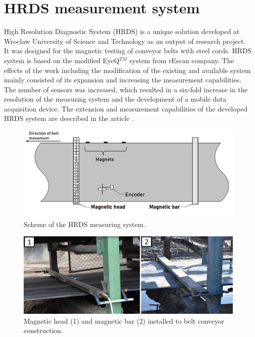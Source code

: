 \documentclass[applsci,article,preprint,moreauthors,pdftex]{Definitions/mdpi}
\begin{document}
\section{HRDS measurement system}

High Resolution Diagnostic System (HRDS) is a unique solution developed at Wroclaw University of Science and Technology as an output of research project. It was designed for the magnetic testing of conveyor belts with steel cords. HRDS system is based on the modified EyeQ$^{TM}$ system from rEscan company. The effects of the work including the modification of the existing and available system mainly consisted of its expansion and increasing the measurement capabilities. The number of sensors was increased, which resulted in a six-fold increase in the resolution of the measuring system and the development of a mobile data acquisition device. The extension and measurement capabilities of the developed HRDS system are described in the article \cite{blazej2014diagnostics}.

\begin{figure}[ht!]
\centering
\includegraphics[width=.8\textwidth]{figs/hrds.png}
\caption{Scheme of the HRDS measuring system.}
\label{fig:hrds}
\end{figure}

\begin{figure}[ht!]
\centering
\includegraphics[width=\textwidth]{figs/hrds2.png}
\caption{Magnetic head (1) and magnetic bar (2) installed to belt conveyor construction.}
\label{fig:hrds2}
\end{figure}
\end{document}
